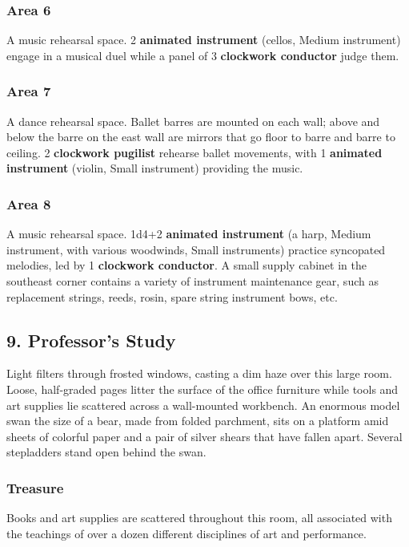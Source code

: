 \documentclass[10pt,a4paper,twoside,bg=print,twocolumn,openany,nodeprecatedcode]{dndbook}
\begin{document}
\subsubsection{Area 6}
A music rehearsal space. 2 \textbf{animated instrument} (cellos, Medium instrument) engage in a musical duel while a panel of 3 \textbf{clockwork conductor} judge them.

\subsubsection{Area 7}
A dance rehearsal space. Ballet barres are mounted on each wall; above and below the barre on the east wall are mirrors that go floor to barre and barre to ceiling. 2 \textbf{clockwork pugilist} rehearse ballet movements, with 1 \textbf{animated instrument} (violin, Small instrument) providing the music.

\subsubsection{Area 8}
A music rehearsal space. 1d4+2 \textbf{animated instrument} (a harp, Medium instrument, with various woodwinds, Small instruments) practice syncopated melodies, led by 1 \textbf{clockwork conductor}. A small supply cabinet in the southeast corner contains a variety of instrument maintenance gear, such as replacement strings, reeds, rosin, spare string instrument bows, etc.

\subsection{9. Professor's Study}
\begin{DndReadAloud}{}
Light filters through frosted windows, casting a dim haze over this large room. Loose, half-graded pages litter the surface of the office furniture while tools and art supplies lie scattered across a wall-mounted workbench. An enormous model swan the size of a bear, made from folded parchment, sits on a platform amid sheets of colorful paper and a pair of silver shears that have fallen apart. Several stepladders stand open behind the swan.

\end{DndReadAloud}

\subsubsection{Treasure}
Books and art supplies are scattered throughout this room, all associated with the teachings of over a dozen different disciplines of art and performance.
\end{document}
